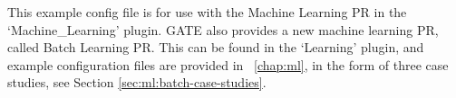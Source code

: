 %
%
%
%



This example config file is for use with the Machine Learning PR in the
`Machine\_Learning' plugin. GATE also provides a new machine learning PR,
called Batch Learning PR. This can be found in the `Learning' plugin, and example
configuration files are provided in \Chapthing~\ref{chap:ml}, in the form of
three case studies, see Section \ref{sec:ml:batch-case-studies}. 

